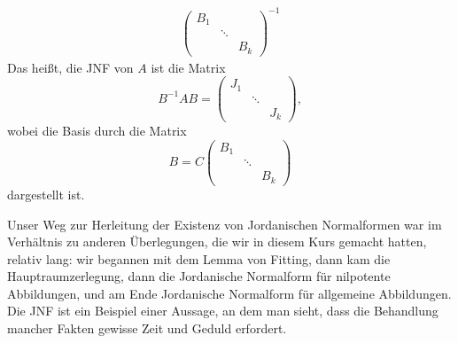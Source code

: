 \begin{bem}
\begin{enumerate}
\begin{align*}
\begin{pmatrix}
					B_1 && \\
					& \ddots & \\
					&& B_k
				\end{pmatrix}^{-1}
			\end{align*}
			Das heißt, die JNF von $A$ ist die Matrix 
			\[ B^{-1}AB = \begin{pmatrix}
				J_1 && \\
				& \ddots & \\
				&& J_k
			\end{pmatrix},
			\]
			wobei die Basis durch die Matrix 
			\[ B = C \begin{pmatrix}
				B_1 && \\
				& \ddots & \\
				&& B_k
			\end{pmatrix} \]
			dargestellt ist. 
	\end{enumerate}
\end{bem}

\begin{bem}
	Unser Weg zur Herleitung der Existenz von Jordanischen Normalformen war im Verhältnis zu anderen Überlegungen, die wir in diesem Kurs gemacht hatten, relativ lang: wir begannen mit dem Lemma von Fitting, dann kam die Hauptraumzerlegung, dann die Jordanische Normalform für nilpotente Abbildungen, und am Ende Jordanische Normalform für allgemeine Abbildungen. Die JNF ist ein Beispiel einer Aussage, an dem man sieht, dass die Behandlung mancher Fakten gewisse Zeit und Geduld erfordert.
\end{bem} 
